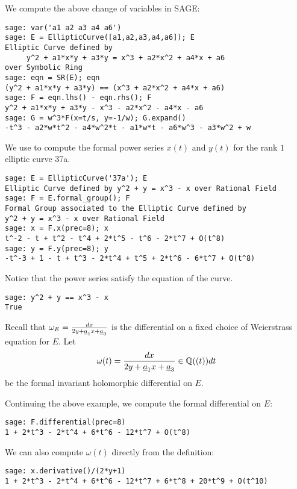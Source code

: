 \begin{example}
We compute the above change of variables in SAGE:
\begin{verbatim}
sage: var('a1 a2 a3 a4 a6')
sage: E = EllipticCurve([a1,a2,a3,a4,a6]); E
Elliptic Curve defined by
     y^2 + a1*x*y + a3*y = x^3 + a2*x^2 + a4*x + a6
over Symbolic Ring
sage: eqn = SR(E); eqn
(y^2 + a1*x*y + a3*y) == (x^3 + a2*x^2 + a4*x + a6)
sage: F = eqn.lhs() - eqn.rhs(); F
y^2 + a1*x*y + a3*y - x^3 - a2*x^2 - a4*x - a6
sage: G = w^3*F(x=t/s, y=-1/w); G.expand()
-t^3 - a2*w*t^2 - a4*w^2*t - a1*w*t - a6*w^3 - a3*w^2 + w
\end{verbatim}
\end{example}

\begin{example}
We use \sage to compute the formal power series $x(t)$ and $y(t)$
for the rank $1$ elliptic curve 37a.
\begin{verbatim}
sage: E = EllipticCurve('37a'); E
Elliptic Curve defined by y^2 + y = x^3 - x over Rational Field
sage: F = E.formal_group(); F
Formal Group associated to the Elliptic Curve defined by
y^2 + y = x^3 - x over Rational Field
sage: x = F.x(prec=8); x
t^-2 - t + t^2 - t^4 + 2*t^5 - t^6 - 2*t^7 + O(t^8)
sage: y = F.y(prec=8); y
-t^-3 + 1 - t + t^3 - 2*t^4 + t^5 + 2*t^6 - 6*t^7 + O(t^8)
\end{verbatim}%

\noindent{}Notice that the power series satisfy the equation of the curve.
\begin{verbatim}
sage: y^2 + y == x^3 - x
True
\end{verbatim}
\end{example}

Recall that $\omega_E = \frac{dx}{2y + \underline{a}_1 x + \underline{a}_3}$ is the
differential on a fixed choice of Weierstrass equation for
$E$. Let
$$
 \omega(t) = \frac{dx}{2y + \underline{a}_1 x + \underline{a}_3} \in \mathbb{Q}((t)) dt
$$
be the formal invariant holomorphic differential on $E$.
\begin{example}
Continuing the above example, we compute the formal
differential on $E$:
\begin{verbatim}
sage: F.differential(prec=8)
1 + 2*t^3 - 2*t^4 + 6*t^6 - 12*t^7 + O(t^8)
\end{verbatim}%

\noindent{}We can also compute $\omega(t)$ directly from the definition:
\begin{verbatim}
sage: x.derivative()/(2*y+1)
1 + 2*t^3 - 2*t^4 + 6*t^6 - 12*t^7 + 6*t^8 + 20*t^9 + O(t^10)
\end{verbatim}
\end{example}

